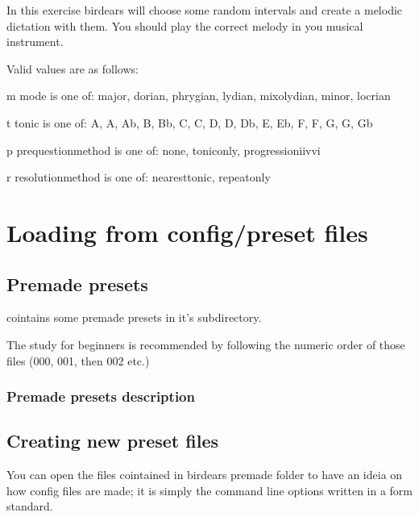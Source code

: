 \documentclass[letterpaper,10pt,english]{sphinxmanual}
\begin{document}
\begin{sphinxVerbatim}[commandchars=\\\{\}]
  In this exercise birdears will choose some random intervals and create a
  melodic dictation with them. You should play the correct melody in you
  musical instrument.

  Valid values are as follows:

  \PYGZhy{}m \PYGZlt{}mode\PYGZgt{} is one of: major, dorian, phrygian, lydian, mixolydian, minor,
  locrian

  \PYGZhy{}t \PYGZlt{}tonic\PYGZgt{} is one of: A, A\PYGZsh{}, Ab, B, Bb, C, C\PYGZsh{}, D, D\PYGZsh{}, Db, E, Eb, F, F\PYGZsh{}, G,
  G\PYGZsh{}, Gb

  \PYGZhy{}p \PYGZlt{}prequestion\PYGZus{}method\PYGZgt{} is one of: none, tonic\PYGZus{}only, progression\PYGZus{}i\PYGZus{}iv\PYGZus{}v\PYGZus{}i

  \PYGZhy{}r \PYGZlt{}resolution\PYGZus{}method\PYGZgt{} is one of: nearest\PYGZus{}tonic, repeat\PYGZus{}only
\end{sphinxVerbatim}


\section{Loading from config/preset files}
\label{\detokenize{index:loading-from-config-preset-files}}

\subsection{Pre\sphinxhyphen{}made presets}
\label{\detokenize{index:pre-made-presets}}
\sphinxAtStartPar
{} cointains some pre\sphinxhyphen{}made presets in it’s 
subdirectory.

\sphinxAtStartPar
The study for beginners is recommended by following the numeric order of
those files (000, 001, then 002 etc.)


\subsubsection{Pre\sphinxhyphen{}made presets description}
\label{\detokenize{index:pre-made-presets-description}}
\sphinxAtStartPar
{}


\subsection{Creating new preset files}
\label{\detokenize{index:creating-new-preset-files}}
\sphinxAtStartPar
You can open the files cointained in birdears premade 
folder to have an ideia on how config files are made; it is simply the
command line options written in a form  standard.
\end{document}
